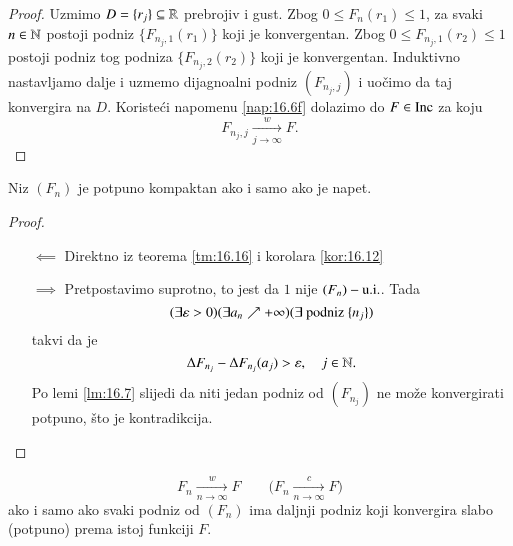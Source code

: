 \begin{proof}
    Uzmimo $D = \{r_j\} \subseteq \mathbb{R}$ prebrojiv i gust.
    Zbog $0 \leq F_n (r_1) \leq 1$, za svaki $n \in \mathbb{N}$ postoji podniz $\{ F_{n_j, 1} (r_1) \}$ koji je konvergentan.
    Zbog $0 \leq F_{n_j, 1 } (r_2) \leq 1$ postoji podniz tog podniza $\{ F_{n_j, 2} (r_2) \}$ koji je konvergentan.
    Induktivno nastavljamo dalje i uzmemo dijagnoalni podniz $(F_{n_j, j})$ i uo\v cimo da taj konvergira na $D$.
    Koriste\' ci napomenu \ref{nap:16.6f} dolazimo do $F \in \mathrm{Inc}$ za koju
    \begin{equation*}
        F_{n_j, j} \xrightarrow[j \to \infty]{w} F.
    \end{equation*} 
\end{proof}

\begin{kor} \label{kor:16.17}
    Niz $(F_n)$ je potpuno kompaktan ako i samo ako je napet.
\end{kor}

\begin{proof}
    \quad \\
    \begin{itemize}
        \item[$\impliedby$]
        Direktno iz teorema \ref{tm:16.16} i korolara \ref{kor:16.12}
        \item[$\implies$]
        Pretpostavimo suprotno, to jest da $1$ nije $(F_n)-\mathrm{u.i.}$.
        Tada
        \begin{equation*}
            (\exists \varepsilon > 0) (\exists a_n \nearrow + \infty) (\exists \textnormal{ podniz } \{n_j\})
        \end{equation*}
        takvi da je
        \begin{equation*}
            \Delta F_{n_j} - \Delta F_{n_j} (a_j) > \varepsilon, \quad j \in \mathbb{N}.
        \end{equation*}
        Po lemi \ref{lm:16.7} slijedi da niti jedan podniz od $(F_{n_j})$ ne mo\v ze konvergirati potpuno, \v sto je kontradikcija.
    \end{itemize}    
\end{proof}

\begin{zad} \label{zad:16.18}
    \begin{equation*}
        F_n \xrightarrow[n \to \infty]{w} F \quad \quad \big( F_n \xrightarrow[n \to \infty]{c} F \big)
    \end{equation*}
    ako i samo ako svaki podniz od $(F_n)$ ima daljnji podniz koji konvergira slabo (potpuno) prema istoj funkciji $F$.
\end{zad}